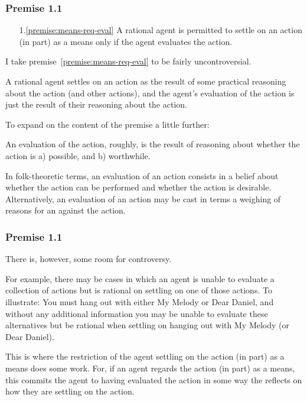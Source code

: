 \documentclass[noamssymb,
]{beamer} %
\newcommand{\hozlinedash}[0]{
  \noindent\hdashrule[0.5ex][c]{\textwidth}{.1pt}{2.5pt}
}
\begin{document}
\begin{frame}
  \frametitle{Premise 1.1}

  \begin{itemize}
  \item[1.\ref{premise:means-req-eval}] A rational agent is permitted to settle on an action (in part) as a means only if the agent evaluates the action.
  \end{itemize}



  I take premise~\ref{premise:means-req-eval} to be fairly uncontroversial.

  A rational agent settles on an action as the result of some practical reasoning about the action (and other actions), and the agent's evaluation of the action is just the result of their reasoning about the action.

  \hozlinedash

  To expand on the content of the premise a little further:

  An evaluation of the action, roughly, is the result of reasoning about whether the action is a) possible, and b) worthwhile.


  In folk-theoretic terms, an evaluation of an action consists in a belief about whether the action can be performed and whether the action is desirable.
  Alternatively, an evaluation of an action may be cast in terms a weighing of reasons for an against the action.
\end{frame}

\begin{frame}
  \frametitle{Premise 1.1}

  There is, however, some room for controversy.

For example, there may be cases in which an agent is unable to evaluate a collection of actions but is rational on settling on one of those actions.
To illustrate: You must hang out with either My Melody or Dear Daniel, and without any additional information you may be unable to evaluate these alternatives but be rational when settling on hanging out with My Melody (or Dear Daniel).

This is where the restriction of the agent settling on the action (in part) as a means does some work.
For, if an agent regards the action (in part) as a means, this commits the agent to having evaluated the action in some way the reflects on how they are settling on the action.
\end{frame}
\end{document}
